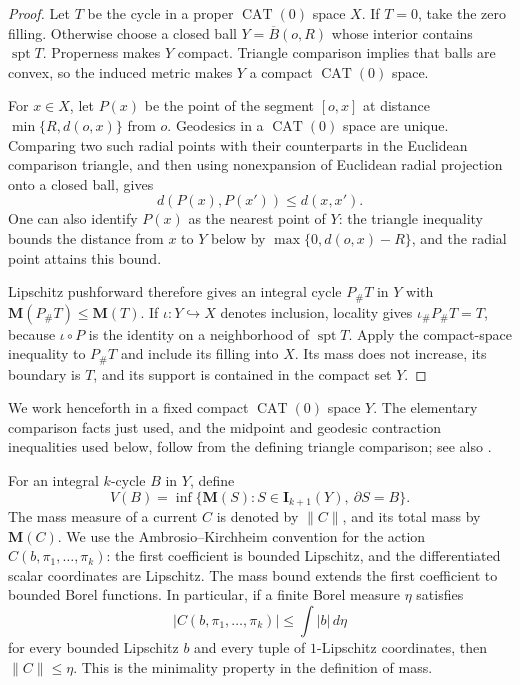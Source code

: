 \documentclass[11pt]{article}
\numberwithin{equation}{section}
\theoremstyle{definition}
\theoremstyle{remark}
\begin{document}
\begin{proof}
Let \(T\) be the cycle in a proper \(\operatorname{CAT}(0)\) space \(X\).
If \(T=0\), take the zero filling. Otherwise choose a closed ball
\(Y=\overline B(o,R)\) whose interior contains \(\operatorname{spt} T\).
Properness makes \(Y\) compact. Triangle comparison implies that balls
are convex, so the induced metric makes \(Y\) a compact
\(\operatorname{CAT}(0)\) space.

For \(x\in X\), let \(P(x)\) be the point of the segment \([o,x]\)
at distance \(\min\{R,d(o,x)\}\) from \(o\).
Geodesics in a \(\operatorname{CAT}(0)\) space are unique. Comparing two
such radial points with their counterparts in the Euclidean comparison
triangle, and then using nonexpansion of Euclidean radial projection onto
a closed ball, gives
\[
 d(P(x),P(x'))\le d(x,x').
\]
One can also identify \(P(x)\) as the nearest point of \(Y\): the triangle
inequality bounds the distance from \(x\) to \(Y\) below by
\(\max\{0,d(o,x)-R\}\), and the radial point attains this bound.

Lipschitz pushforward therefore gives an integral cycle \(P_\#T\) in
\(Y\) with \(\mathbf M(P_\#T)\le\mathbf M(T)\). If
\(\iota:Y\hookrightarrow X\) denotes inclusion, locality gives
\(\iota_\#P_\#T=T\), because \(\iota\circ P\) is the identity on a
neighborhood of \(\operatorname{spt} T\). Apply the compact-space inequality to
\(P_\#T\) and include its filling into \(X\). Its mass does not increase,
its boundary is \(T\), and its support is contained in the compact set
\(Y\).
\end{proof}

We work henceforth in a fixed compact \(\operatorname{CAT}(0)\) space
\(Y\). The elementary comparison facts just used, and the midpoint and
geodesic contraction inequalities used below, follow from the defining
triangle comparison; see also \cite[Chapter~II.2]{BridsonHaefliger1999}.

For an integral \(k\)-cycle \(B\) in \(Y\), define
\begin{equation}
\label{eq:filling-volume-definition}
 V(B)=\inf\{\mathbf M(S):S\in\mathbf I_{k+1}(Y),\ \partial S=B\}.
\end{equation}
The mass measure of a current \(C\) is denoted by \(\|C\|\), and its total
mass by \(\mathbf M(C)\). We use the Ambrosio--Kirchheim convention for the action
\(C(b,\pi_1,\ldots,\pi_k)\): the first coefficient is bounded Lipschitz,
and the differentiated scalar coordinates are Lipschitz. The mass bound
extends the first coefficient to bounded Borel functions. In particular,
if a finite Borel measure \(\eta\) satisfies
\begin{equation}
\label{eq:mass-controlling-measure}
 |C(b,\pi_1,\ldots,\pi_k)|\le\int |b|\,d\eta
\end{equation}
for every bounded Lipschitz \(b\) and every tuple of \(1\)-Lipschitz
coordinates, then \(\|C\|\le\eta\). This is the minimality property in
the definition of mass.
\end{document}
